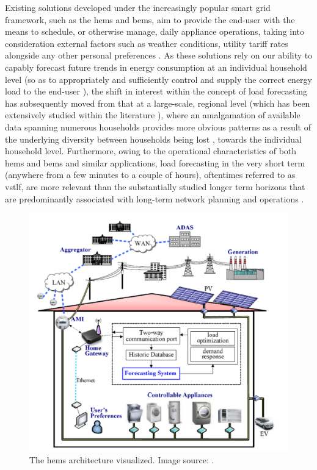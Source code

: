 \noindent \newline Existing solutions developed under the increasingly popular smart grid framework, such as the \gls{hems} and \gls{bems}, aim to provide the end-user with the means to schedule, or otherwise manage, daily appliance operations, taking into consideration external factors such as weather conditions, utility tariff rates alongside any other personal preferences \cite{Yildiz}. As these solutions rely on our ability to capably forecast future trends in energy consumption at an individual household level (so as to appropriately and sufficiently control and supply the correct energy load to the end-user \cite{Raza, Kareem}), the shift in interest within the concept of load forecasting has subsequently moved from that at a large-scale, regional level (which has been extensively studied within the literature \cite{Foucquier}), where an amalgamation of available data spanning numerous households provides more obvious patterns as a result of the underlying diversity between households being lost \cite{Kong}, towards the individual household level. Furthermore, owing to the operational characteristics of both \gls{hems} and \gls{bems} and similar applications, load forecasting in the very short term (anywhere from a few minutes to a couple of hours), oftentimes referred to as \gls{vstlf}, are more relevant than the substantially studied longer term horizons that are predominantly associated with long-term network planning and operations \cite{Yildiz}.

\begin{figure}[hbt!]
    \centering
    \includegraphics[width=\textwidth]{Images/Chapter 1/Yang/HEMS-Architecture.pdf}
    \caption{The \gls{hems} architecture visualized. Image source: \cite{Yang} .}
    \label{fig:HEMS-Architecture}
\end{figure}

